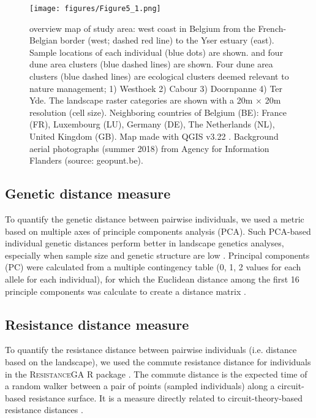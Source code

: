 \documentclass[10pt, twoside]{book} %
\begin{document}
		\begin{figure}[h!]
			\begin{center}
				\texttt{[image: figures/Figure5\_1.png]}
			\end{center}
			\begin{footnotesize}
				\caption{overview map of study area: west coast in Belgium from the French-Belgian border (west; dashed red line) to the Yser estuary (east). Sample locations of each individual (blue dots) are shown. and four dune area clusters (blue dashed lines) are shown. Four dune area clusters (blue dashed lines) are ecological clusters deemed relevant to nature management; 1) Westhoek 2) Cabour 3) Doornpanne 4) Ter Yde. The landscape raster categories are shown with a 20m $\times$ 20m resolution (cell size). Neighboring countries of Belgium (BE): France (FR), Luxembourg (LU), Germany (DE), The Netherlands (NL), United Kingdom (GB). Map made with QGIS v3.22 \citep{qgisdevelopmentteam2020}. Background aerial photographs (summer 2018) from Agency for Information Flanders (source: geopunt.be).  \label{fig5.1}}
			\end{footnotesize}
		\end{figure}
	
	
		\subsection{Genetic distance measure}
		To quantify the genetic distance between pairwise individuals, we used a metric based on multiple axes of principle components analysis (PCA). Such PCA-based individual genetic distances perform better in landscape genetics analyses, especially when sample size and genetic structure are low \citep{shirk2017, kimmig2020}. Principal components (PC) were calculated from a multiple contingency table (0, 1, 2 values for each allele for each individual), for which the Euclidean distance among the first 16 principle components was calculate to create a distance matrix \citep{shirk2017}.\\
		
		\subsection{Resistance distance measure}
		\enlargethispage{1\baselineskip}
		To quantify the resistance distance between pairwise individuals (i.e. distance based on the landscape), we used the commute resistance distance for individuals in the \textsc{ResistanceGA} R package \citep{vanetten2017, peterman2018}. The commute distance is the expected time of a random walker between a pair of points (sampled individuals) along a circuit-based resistance surface. It is a measure directly related to circuit-theory-based resistance distances \citep{mcrae2008, peterman2018}.\\
		
\end{document}
